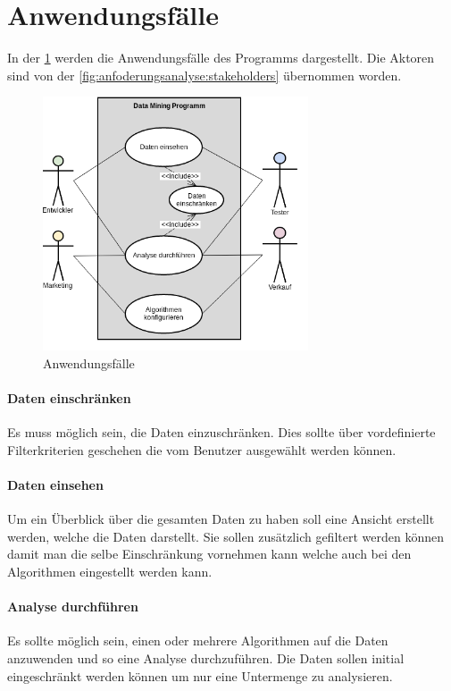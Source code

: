 \section{Anwendungsfälle}
\label{sec:anforderungsanalyse:anwendungsfaelle}
In der \cref{fig:anfoderungsanalyse:anwendungsfaelle:1} werden die Anwendungsfälle des Programms dargestellt. Die Aktoren sind von der \cref{fig:anfoderungsanalyse:stakeholders} übernommen worden. 
\begin{figure}[H]
	\RawFloats
	\centering
	\includegraphics[width=0.7\textwidth]{images/usecase}
	\caption{Anwendungsfälle}
	\label{fig:anfoderungsanalyse:anwendungsfaelle:1}
\end{figure}

\paragraph{Daten einschränken} Es muss möglich sein, die Daten einzuschränken. Dies sollte über vordefinierte Filterkriterien geschehen die vom Benutzer ausgewählt werden können.

\paragraph{Daten einsehen} Um ein Überblick über die gesamten Daten zu haben soll eine Ansicht erstellt werden, welche die Daten darstellt. Sie sollen zusätzlich gefiltert werden können damit man die selbe Einschränkung vornehmen kann welche auch bei den Algorithmen eingestellt werden kann.

\paragraph{Analyse durchführen} Es sollte möglich sein, einen oder mehrere Algorithmen auf die Daten anzuwenden und so eine Analyse durchzuführen. Die Daten sollen initial eingeschränkt werden können um nur eine Untermenge zu analysieren.

